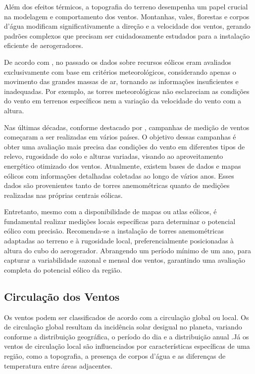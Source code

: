 \par Além dos efeitos térmicos, a topografia do terreno desempenha um papel crucial na modelagem e comportamento dos ventos. Montanhas, vales, florestas e corpos d'água modificam significativamente a direção e a velocidade dos ventos, gerando padrões complexos que precisam ser cuidadosamente estudados para a instalação eficiente de aerogeradores.

\par De acordo com , no passado os dados sobre recursos eólicos eram avaliados exclusivamente com base em critérios meteorológicos, considerando apenas o movimento das grandes massas de ar, tornando as informações insuficientes e inadequadas. Por exemplo, as torres meteorológicas não esclareciam as condições do vento em terrenos específicos nem a variação da velocidade do vento com a altura.

\par Nas últimas décadas, conforme destacado por , campanhas de medição de ventos começaram a ser realizadas em vários países. O objetivo dessas campanhas é obter uma avaliação mais precisa das condições do vento em diferentes tipos de relevo, rugosidade do solo e alturas variadas, visando ao aproveitamento energético otimizado dos ventos. Atualmente, existem bases de dados e mapas eólicos com informações detalhadas coletadas ao longo de vários anos. Esses dados são provenientes tanto de torres anemométricas quanto de medições realizadas nas próprias centrais eólicas.

\par Entretanto, mesmo com a disponibilidade de mapas ou atlas eólicos, é fundamental realizar medições locais específicas para determinar o potencial eólico com precisão. Recomenda-se a instalação de torres anemométricas adaptadas ao terreno e à rugosidade local, preferencialmente posicionadas à altura do cubo do aerogerador. Abrangendo um período mínimo de um ano, para capturar a variabilidade sazonal e mensal dos ventos, garantindo uma avaliação completa do potencial eólico da região.

 \subsection{Circulação dos Ventos}
 \par Os ventos podem ser classificados de acordo com a  circulação global ou local. Os de circulação global resultam da incidência solar desigual no planeta, variando conforme a distribuição geográfica, o período do dia e a distribuição anual \cite{martins2008}.Já os ventos de circulação local são influenciados por características específicas de uma região, como a topografia, a presença de corpos d'água e as diferenças de temperatura entre áreas adjacentes.
 
